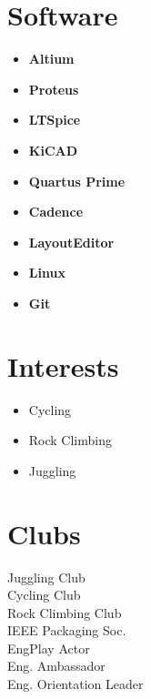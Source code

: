 \documentclass[]{chandan-cv}
\begin{document}
\begin{minipage}[t]{0.23\textwidth}

\section{Software}
	\begin{itemize}
		\setlength\itemsep{-0.17em}
		\item \textbf{Altium}
		\item \textbf{Proteus}
		\item \textbf{LTSpice}
		\item \textbf{KiCAD}
		\item \textbf{Quartus Prime}
		\item \textbf{Cadence}
		\item \textbf{LayoutEditor}
		\item \textbf{Linux}
		\item \textbf{Git}
	\end{itemize}

\section{Interests}
\begin{itemize}
	\setlength\itemsep{-0.3em}
    \item Cycling
	\item Rock Climbing
	\item Juggling
\end{itemize}

\section{Clubs}
Juggling Club \\
Cycling Club \\
Rock Climbing Club \\
IEEE Packaging Soc. \\
EngPlay Actor \\
Eng. Ambassador \\
Eng. Orientation Leader

\sectionsep


%
%

\end{minipage}
\end{document}
